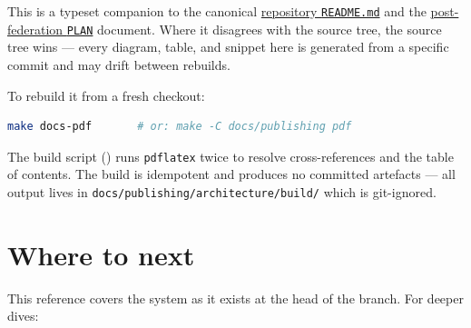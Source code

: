 \documentclass[11pt,a4paper,openany]{book}
\begin{document}
\frontmatter
\pagestyle{empty}

\noindent
\begin{snapnote}[title={About this document}]
This is a typeset companion to the canonical
\href{https://github.com/hugmesh/hugmesh-games}{repository
\texttt{README.md}} and the
\href{https://github.com/hugmesh/hugmesh-games/blob/main/docs/PLAN-module-federation-and-native.md}{post-federation
\texttt{PLAN}} document. Where it disagrees with the source tree, the source
tree wins — every diagram, table, and snippet here is generated from a
specific commit and may drift between rebuilds.

To rebuild it from a fresh checkout:
\begin{lstlisting}[language=bash]
make docs-pdf       # or: make -C docs/publishing pdf
\end{lstlisting}
The build script () runs
\texttt{pdflatex} twice to resolve cross-references and the table of
contents. The build is idempotent and produces no committed artefacts —
all output lives in \texttt{docs/publishing/architecture/build/} which is
git-ignored.
\end{snapnote}

\vspace{1em}
\tableofcontents
\clearpage

\mainmatter
\pagestyle{fancy}










\backmatter

\chapter{Where to next}

This reference covers the system as it exists at the head of the
 branch. For deeper dives:
\end{document}

